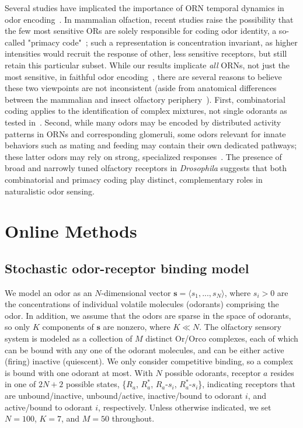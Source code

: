 Several studies have implicated the importance of ORN temporal dynamics in odor encoding~\cite{multiple_timescales_stopfer, primacy_coding, olfactory_coding_latency, chih-ying, martelli, odor_coding_rate_verhagen, neural_network_temporal_coding, dweck}. In mammalian olfaction, recent studies raise the possibility that the few most sensitive ORs are solely responsible for coding odor identity, a so-called "primacy code"~\cite{primacy_coding}; such a representation is concentration invariant, as higher intensities would recruit the response of other, less sensitive receptors, but still retain this particular subset. While our results implicate \textit{all} ORNs, not just the most sensitive, in faithful odor encoding~\cite{vijay_1}, there are several reasons to believe these two viewpoints are not inconsistent (aside from anatomical differences between the mammalian and insect olfactory periphery~\cite{mammalian_olfaction}). First, combinatorial coding applies to the identification of complex mixtures, not single odorants as tested in~\cite{primacy_coding}. Second, while many odors may be encoded by distributed activity patterns in ORNs and corresponding glomeruli, some odors relevant for innate behaviors such as mating and feeding may contain their own dedicated pathways; these latter odors may rely on strong, specialized responses~\cite{dweck, evolution_insect_olfaction}. The presence of broad and narrowly tuned olfactory receptors in \textit{Drosophila} suggests that both combinatorial and primacy coding play distinct, complementary roles in naturalistic odor sensing. 







\section{Online Methods}

\subsection{Stochastic odor-receptor binding model}

We model an odor as an $N$-dimensional vector $\mathbf s = \langle s_1,...,s_N\rangle$, where $s_i > 0$ are the concentrations of individual volatile molecules (odorants) comprising the odor. In addition, we assume that the odors are sparse in the space of odorants, so only $K$ components of $\mathbf s$ are nonzero, where $K \ll N$. The olfactory sensory system is modeled as a collection of $M$ distinct Or/Orco complexes, each of which can be bound with any one of the odorant molecules, and can be either active (firing) inactive (quiescent). We only consider competitive binding, so a complex is bound with one odorant at most. With $N$ possible odorants, receptor $a$ resides in one of $2N+2$ possible states, \{$R_a$, $R^*_a$, $R_a$-$s_i$, $R^*_a$-$s_i$\}, indicating receptors that are unbound/inactive, unbound/active, inactive/bound to odorant $i$, and active/bound to odorant $i$, respectively. Unless otherwise indicated, we set $N = 100$, $K = 7$, and $M = 50$ throughout.

